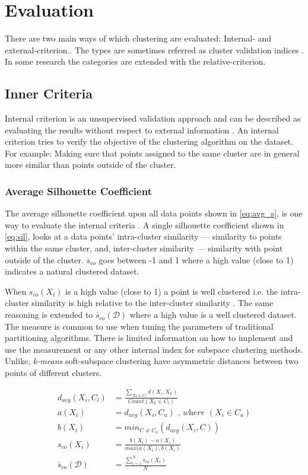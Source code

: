\documentclass[../report.tex]{subfiles}
\begin{document}
\section{Evaluation}
There are two main ways of which clustering are evaluated: Internal- and external-criterion.\cite{manning2010introduction}. The types are sometimes referred as cluster validation indices \cite{Halkidi2002}.
In some research the categories are extended with the relative-criterion.\cite{Halkidi2002}

\subsection{Inner Criteria} \label{sec:Internal}
Internal criterion is an unsupervised validation approach and can be described as evaluating the results without respect to external information \cite{Halkidi2002}. An internal criterion tries to verify the objective of the clustering algorithm on the dataset. For example: Making sure that points assigned to the same cluster are in general more similar than points outside of the cluster.

\subsubsection{Average Silhouette Coefficient}
The average silhouette coefficient upon all data points shown in \ref{eq:avg_s}, is one way to evaluate the internal criteria \cite{ROUSSEEUW198753}. A single silhouette coefficient shown in \ref{eq:sil}, looks at a data points' intra-cluster similarity --- similarity to points within the same cluster, and, inter-cluster similarity --- similarity with point outside of the cluster. $\overline{s}_{co}$ goes between -1 and 1 where a high value (close to 1) indicates a natural clustered dataset.

When $s_{co}(X_i)$ is a high value (close to 1) a point is well clustered i.e. the intra-cluster similarity is high relative to the inter-cluster similarity \cite{ROUSSEEUW198753}
. The same reasoning is extended to $\overline{s}_{co}(\mathcal{D})$ where a high value is a well clustered dataset. The measure is common to use when tuning the parameters of traditional partitioning algorithms. There is limited information on how to implement and use the measurement or any other internal index for subspace clustering methods. Unlike, \textit{k-means} soft-subspace clustering have asymmetric distances between two points of different clusters.

\begin{align}
  d_{avg}(X_i,C_l) &= \frac{\sum_{X_k \in C_l}d(X_i,X_k)}{Count(X_k \in C_l)} \\
  a(X_i) &= d_{avg}(X_i,C_a) \textit{ , where } (X_i \in C_a) \\
  b(X_i) &= min_{C \neq C_a}(d_{avg}(X_i,C)) \\
 \label{eq:sil}
  s_{co}(X_i) &= \frac{b(X_i) - a(X_i)}{max(a(X_i), b(X_i)} \\
\label{eq:avg_s}
  \overline{s}_{co}(\mathcal{D}) &= \frac{\sum^{N}_{i=1} s_{co}(X_i)}{N}
\end{align}
\end{document}
